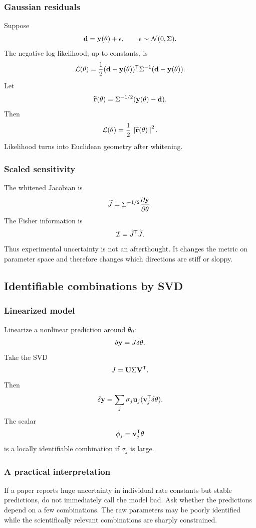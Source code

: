 \subsubsection*{Gaussian residuals}

Suppose
\[
  \mathbf{d}
  =
  \mathbf{y}(\theta)+\mathsf{\epsilon},
  \qquad
  \mathsf{\epsilon}\sim\mathcal{N}(0,\Sigma).
\]
The negative log likelihood, up to constants, is
\[
  \mathcal{L}(\theta)
  =
  \frac{1}{2}
  (\mathbf{d}-\mathbf{y}(\theta))^{\mathsf{T}}
  \Sigma^{-1}
  (\mathbf{d}-\mathbf{y}(\theta)).
\]
Let
\[
  \widetilde{\mathbf{r}}(\theta)
  =
  \Sigma^{-1/2}
  (\mathbf{y}(\theta)-\mathbf{d}).
\]
Then
\[
  \mathcal{L}(\theta)=\frac{1}{2}\left\lVert \widetilde{\mathbf{r}}(\theta)\right\rVert^2.
\]
Likelihood turns into Euclidean geometry after whitening.

\subsubsection*{Scaled sensitivity}

The whitened Jacobian is
\[
  \widetilde{J}
  =
  \Sigma^{-1/2}
  \frac{\partial \mathbf{y}}{\partial \theta}.
\]
The Fisher information is
\[
  \mathcal{I}=\widetilde{J}^{\mathsf{T}}\widetilde{J}.
\]
Thus experimental uncertainty is not an afterthought.  It changes the metric on parameter space and therefore changes which directions are stiff or sloppy.

\subsection{Identifiable combinations by SVD}

\subsubsection*{Linearized model}

Linearize a nonlinear prediction around \(\theta_0\):
\[
  \delta\mathbf{y}
  =
  J\delta\theta.
\]
Take the SVD
\[
  J=\mathbf{U}\Sigma\mathbf{V}^{\mathsf{T}}.
\]
Then
\[
  \delta\mathbf{y}
  =
  \sum_j
  \sigma_j
  \mathbf{u}_j
  (\mathbf{v}_j^{\mathsf{T}}\delta\theta).
\]
The scalar
\[
  \phi_j=\mathbf{v}_j^{\mathsf{T}}\theta
\]
is a locally identifiable combination if \(\sigma_j\) is large.

\subsubsection*{A practical interpretation}

If a paper reports huge uncertainty in individual rate constants but stable predictions, do not immediately call the model bad.  Ask whether the predictions depend on a few combinations.  The raw parameters may be poorly identified while the scientifically relevant combinations are sharply constrained.

